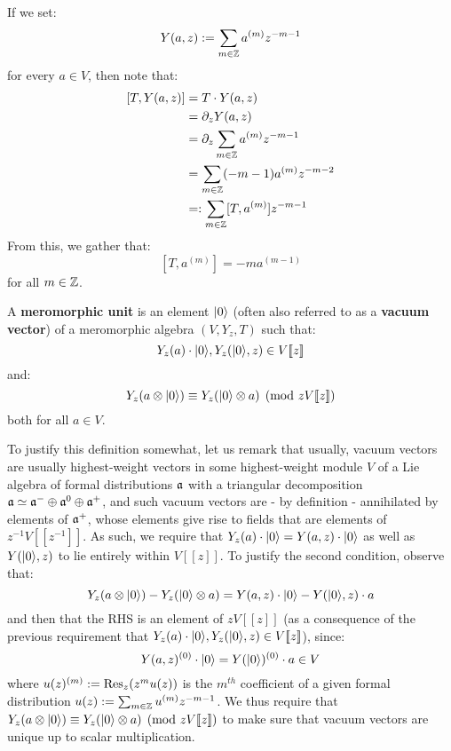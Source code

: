         \begin{remark}
            If we set:
                $$Y(a, z) := \sum_{m \in \mathbb{Z}} a^{(m)} z^{-m - 1}$$
            for every $a \in V$, then note that:
                $$
                    \begin{aligned}
                        [T, Y(a, z)] & = T \cdot Y(a, z)
                        \\
                        & = \del_z Y(a, z)
                        \\
                        & = \del_z \sum_{m \in \Z} a^{(m)} z^{-m - 1}
                        \\
                        & = \sum_{m \in \Z} (-m - 1) a^{(m)} z^{-m - 2}
                        \\
                        & =: \sum_{m \in \Z} [T, a^{(m)}] z^{-m - 1}
                    \end{aligned}
                $$
            From this, we gather that:
                $$[T, a^{(m)}] = -m a^{(m - 1)}$$
            for all $m \in \mathbb{Z}$.
        \end{remark}

        \begin{definition} \label{def: meromorphic_units}
            A \textbf{meromorphic unit} is an element $\lvert {0} \rangle$ (often also referred to as a \textbf{vacuum vector}) of a meromorphic algebra $(V, Y_z, T)$ such that:
                $$Y_z(a) \cdot \lvert {0} \rangle, Y_z( \lvert {0} \rangle, z ) \in V[\![z]\!]$$
            and:
                $$Y_z( a \tensor \ket{0} ) \equiv Y_z( \ket{0} \tensor a ) \pmod{ zV[\![z]\!] }$$
            both for all $a \in V$.
        \end{definition}
        To justify this definition somewhat, let us remark that usually, vacuum vectors are usually highest-weight vectors in some highest-weight module $V$ of a Lie algebra of formal distributions $\mathfrak{a}$ with a triangular decomposition $\mathfrak{a} \simeq \mathfrak{a}^- \oplus \mathfrak{a}^0 \oplus \mathfrak{a}^+$, and such vacuum vectors are - by definition - annihilated by elements of $\mathfrak{a}^+$, whose elements give rise to fields that are elements of $z^{-1}V[\![z^{-1}]\!]$. As such, we require that $Y_z(a) \cdot \lvert {0} \rangle = Y(a, z) \cdot \lvert {0} \rangle$ as well as $Y(\lvert {0} \rangle, z)$ to lie entirely within $V[\![z]\!]$. To justify the second condition, observe that:
            $$Y_z( a \tensor \ket{0} ) - Y_z( \ket{0} \tensor a ) = Y(a, z) \cdot \ket{0} - Y(\ket{0}, z) \cdot a$$
        and then that the RHS is an element of $zV[\![z]\!]$ (as a consequence of the previous requirement that $Y_z(a) \cdot \lvert {0} \rangle, Y_z( \lvert {0} \rangle, z ) \in V[\![z]\!]$), since:
            $$Y(a, z)^{(0)} \cdot \lvert {0} \rangle = Y(\lvert {0} \rangle)^{(0)} \cdot a \in V$$
        where $u(z)^{(m)} := \mathrm{Res}_z (z^m u(z))$ is the $m^{th}$ coefficient of a given formal distribution $u(z) := \sum_{m \in \mathbb{Z}} u^{(m)} z^{-m - 1}$. We thus require that $Y_z( a \tensor \ket{0} ) \equiv Y_z( \ket{0} \tensor a ) \pmod{ zV[\![z]\!] }$ to make sure that vacuum vectors are unique up to scalar multiplication.

